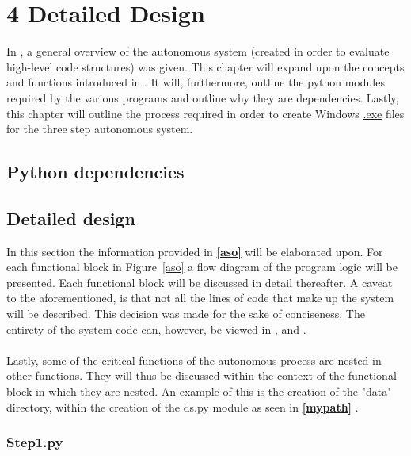 

\chapter*{4 Detailed Design}
\label{4detailedd}
\setcounter{chapter}{4}
\setcounter{section}{0}
\setcounter{figure}{0}
\setcounter{table}{0}

In \textbf{}, a general overview of the autonomous system (created in order to evaluate high-level code structures) was given. This chapter will expand upon the concepts and functions introduced in \textbf{}. It will, furthermore, outline the python modules required by the various programs and outline why they are dependencies. Lastly, this chapter will outline the process required in order to create Windows \hyperref[listExt]{.exe} files for the three step autonomous system. 

\section{Python dependencies}
\label{PyDep}

\section{Detailed design}
\label{detDes}

In this section the information provided in \textbf{\ref{aso} } will be elaborated upon. For each functional block in Figure~\ref{aso} a flow diagram of the program logic will be presented. Each functional block will be discussed in detail thereafter. A caveat to the aforementioned, is that not all the lines of code that make up the system will be described. This decision was made for the sake of conciseness. The entirety of the system code can, however, be viewed in \textbf{}, \textbf{} and \textbf{}.
\\\\
Lastly, some of the critical functions of the autonomous process are nested in other functions. They will thus be discussed within the context of the functional block in which they are nested. An example of this is the creation of the "data" directory, within the creation of the ds.py module as seen in \textbf{\ref{mypath} }.

\newpage\cleardoublepage

\subsection{Step1.py}
\label{step1}

